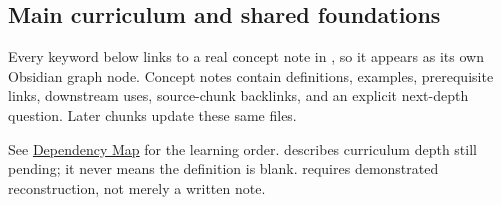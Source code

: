 \subsection{Main curriculum and shared foundations}\label{appendix-a6d556a4ef50-main-curriculum-and-shared-foundations}

\hypertarget{appendix-a6d556a4ef50-main-curriculum-and-shared-foundations}{}

Every keyword below links to a real concept note in , so it appears as its own Obsidian graph node. Concept notes contain definitions, examples, prerequisite links, downstream uses, source-chunk backlinks, and an explicit next-depth question. Later chunks update these same files.

See \hyperref[appendix-4ad47bdd269a]{Dependency Map} for the learning order.  describes curriculum depth still pending; it never means the definition is blank.  requires demonstrated reconstruction, not merely a written note.

